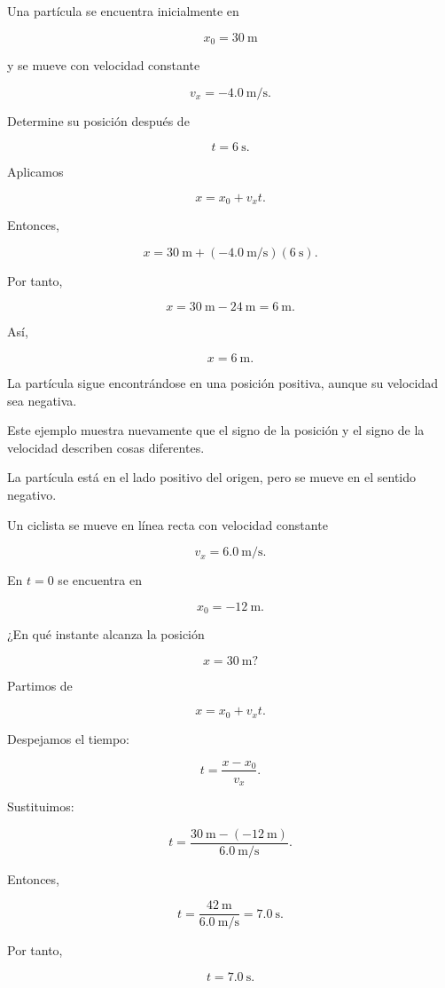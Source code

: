 \begin{ejemplo}

Una partícula se encuentra inicialmente en

\[ x_0=\SI{30}{\meter} \]

y se mueve con velocidad constante

\[ v_x=-\SI{4.0}{\meter\per\second}. \]

Determine su posición después de

\[ t=\SI{6}{\second}. \]

Aplicamos

\[ x=x_0+v_xt. \]

Entonces,

\[
x
=
\SI{30}{\meter}
+
\left(-\SI{4.0}{\meter\per\second}\right)
\left(\SI{6}{\second}\right).
\]

Por tanto,

\[
x
=
\SI{30}{\meter}
-
\SI{24}{\meter}
=
\SI{6}{\meter}.
\]

Así,

\[ \boxed{x=\SI{6}{\meter}}. \]

La partícula sigue encontrándose en una posición positiva, aunque su
velocidad sea negativa.

\begin{interpretacion}
Este ejemplo muestra nuevamente que el signo de la posición y el signo de la
velocidad describen cosas diferentes.

La partícula está en el lado positivo del origen, pero se mueve en el sentido
negativo.
\end{interpretacion}
\end{ejemplo}


\begin{ejemplo}

Un ciclista se mueve en línea recta con velocidad constante

\[ v_x=\SI{6.0}{\meter\per\second}. \]

En \(t=0\) se encuentra en

\[ x_0=-\SI{12}{\meter}. \]

¿En qué instante alcanza la posición

\[ x=\SI{30}{\meter}? \]

Partimos de

\[ x=x_0+v_xt. \]

Despejamos el tiempo:

\[ t=\frac{x-x_0}{v_x}. \]

Sustituimos:

\[
t
=
\frac{
\SI{30}{\meter}-(-\SI{12}{\meter})
}{
\SI{6.0}{\meter\per\second}
}.
\]

Entonces,

\[
t
=
\frac{\SI{42}{\meter}}
{\SI{6.0}{\meter\per\second}}
=
\SI{7.0}{\second}.
\]

Por tanto,

\[ \boxed{t=\SI{7.0}{\second}}. \]
\end{ejemplo}


